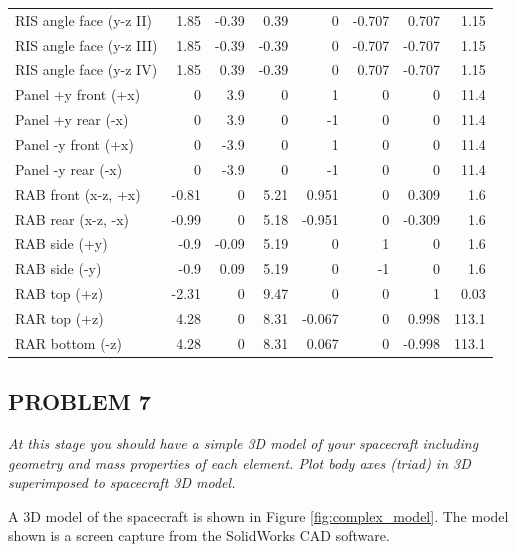 \begin{longtable}{l|r|r|r|r|r|r|r}
RIS angle face (y-z II)        & 1.85  & -0.39 & 0.39  & 0      & -0.707 & 0.707  & 1.15  \\
RIS angle face (y-z III)       & 1.85  & -0.39 & -0.39 & 0      & -0.707 & -0.707 & 1.15  \\
RIS angle face (y-z IV)        & 1.85  & 0.39  & -0.39 & 0      & 0.707  & -0.707 & 1.15  \\
Panel +y front (+x)            & 0     & 3.9   & 0     & 1      & 0      & 0      & 11.4  \\
Panel +y rear (-x)             & 0     & 3.9   & 0     & -1     & 0      & 0      & 11.4  \\
Panel -y front (+x)            & 0     & -3.9  & 0     & 1      & 0      & 0      & 11.4  \\
Panel -y rear (-x)             & 0     & -3.9  & 0     & -1     & 0      & 0      & 11.4  \\
RAB front (x-z, +x)            & -0.81 & 0     & 5.21  & 0.951  & 0      & 0.309  & 1.6   \\
RAB rear (x-z, -x)             & -0.99 & 0     & 5.18  & -0.951 & 0      & -0.309 & 1.6   \\
RAB side (+y)                  & -0.9  & -0.09 & 5.19  & 0      & 1      & 0      & 1.6   \\
RAB side (-y)                  & -0.9  & 0.09  & 5.19  & 0      & -1     & 0      & 1.6   \\
RAB top (+z)                   & -2.31 & 0     & 9.47  & 0      & 0      & 1      & 0.03  \\
RAR top (+z)                   & 4.28  & 0     & 8.31  & -0.067 & 0      & 0.998  & 113.1 \\
RAR bottom (-z)                & 4.28  & 0     & 8.31  & 0.067  & 0      & -0.998 & 113.1
\end{longtable}

\subsection{PROBLEM 7}
\textit{At this stage you should have a simple 3D model of your spacecraft including geometry and mass properties of each element. Plot body axes (triad) in 3D superimposed to spacecraft 3D model.}



A 3D model of the spacecraft is shown in Figure \ref{fig:complex_model}. The model shown is a screen capture from the SolidWorks CAD software.

